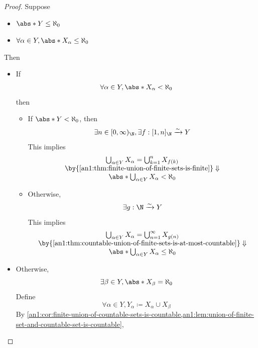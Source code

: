 \begin{proof}
  Suppose
  \begin{itemize}
    \item $\abs*{Y} \leq \aleph_{0}$
    \item $\forall \alpha \in Y, \abs*{X_{\alpha}} \leq \aleph_{0}$
  \end{itemize}
  Then
  \begin{itemize}
    \item If
          \[
            \forall \alpha \in Y, \abs*{X_{\alpha}} < \aleph_{0}
          \]
          then
          \begin{itemize}
            \item If $\abs*{Y} < \aleph_{0}$, then
                  \[
                    \exists n \in [0, \infty)_{\N}, \exists f: [1, n]_{\N} \xrightarrow{\sim} Y
                  \]
                  This implies
                  \[
                    \begin{array}{c}
                      \bigcup_{\alpha \in Y} X_{\alpha} = \bigcup_{k = 1}^{n} X_{f(k)}     \\
                      \by{\Cref{an1:thm:finite-union-of-finite-sets-is-finite}} \Downarrow \\
                      \abs*{\bigcup_{\alpha \in Y} X_{\alpha}} < \aleph_{0}
                    \end{array}
                  \]
            \item Otherwise,
                  \[
                    \exists g: \N \xrightarrow{\sim} Y
                  \]
                  This implies
                  \[
                    \begin{array}{c}
                      \bigcup_{\alpha \in Y} X_{\alpha} = \bigcup_{n = 1}^{\infty} X_{g(n)}              \\
                      \by{\Cref{an1:thm:countable-union-of-finite-sets-is-at-most-countable}} \Downarrow \\
                      \abs*{\bigcup_{\alpha \in Y} X_{\alpha}} \leq \aleph_{0}
                    \end{array}
                  \]
          \end{itemize}
    \item Otherwise,
          \[
            \exists \beta \in Y, \abs*{X_{\beta}} = \aleph_{0}
          \]
          Define
          \[
            \forall \alpha \in Y, Y_{\alpha} \coloneqq X_{\alpha} \cup X_{\beta}
          \]
          By \cref{an1:cor:finite-union-of-countable-sets-is-countable,an1:lem:union-of-finite-set-and-countable-set-is-countable},

\end{itemize}
\end{proof}

